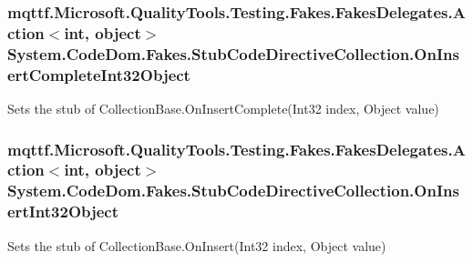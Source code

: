 \hypertarget{class_system_1_1_code_dom_1_1_fakes_1_1_stub_code_directive_collection_a12fabc184d7448063a79328eab49563d}{
\subsubsection[{On\-Insert\-Complete\-Int32\-Object}]{\setlength{\rightskip}{0pt plus 5cm}mqttf.\-Microsoft.\-Quality\-Tools.\-Testing.\-Fakes.\-Fakes\-Delegates.\-Action$<$int, object$>$ System.\-Code\-Dom.\-Fakes.\-Stub\-Code\-Directive\-Collection.\-On\-Insert\-Complete\-Int32\-Object}}\label{class_system_1_1_code_dom_1_1_fakes_1_1_stub_code_directive_collection_a12fabc184d7448063a79328eab49563d}


Sets the stub of Collection\-Base.\-On\-Insert\-Complete(\-Int32 index, Object value)

\hypertarget{class_system_1_1_code_dom_1_1_fakes_1_1_stub_code_directive_collection_ad50317549617884e8ae888375b25642f}{
\subsubsection[{On\-Insert\-Int32\-Object}]{\setlength{\rightskip}{0pt plus 5cm}mqttf.\-Microsoft.\-Quality\-Tools.\-Testing.\-Fakes.\-Fakes\-Delegates.\-Action$<$int, object$>$ System.\-Code\-Dom.\-Fakes.\-Stub\-Code\-Directive\-Collection.\-On\-Insert\-Int32\-Object}}\label{class_system_1_1_code_dom_1_1_fakes_1_1_stub_code_directive_collection_ad50317549617884e8ae888375b25642f}


Sets the stub of Collection\-Base.\-On\-Insert(\-Int32 index, Object value)

